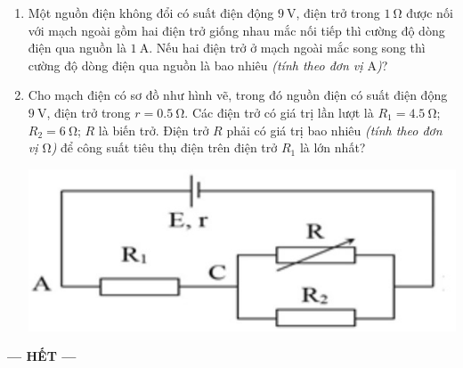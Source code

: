 \begin{enumerate}[label=\bfseries Câu \arabic*:]
\item Một nguồn điện không đổi có suất điện động $\SI{9}{\volt}$, điện trở trong $\SI{1}{\ohm}$ được nối với mạch ngoài gồm hai điện trở giống nhau mắc nối tiếp thì cường độ dòng điện qua nguồn là $\SI{1}{\ampere}$. Nếu hai điện trở ở mạch ngoài mắc song song thì cường độ dòng điện qua nguồn là bao nhiêu \textit{(tính theo đơn vị $\si{\ampere}$)}?



\item Cho mạch điện có sơ đồ như hình vẽ, trong đó nguồn điện có suất điện động $\SI{9}{\volt}$, điện trở trong $r=\SI{0.5}{\ohm}$. Các điện trở có giá trị lần lượt là $R_1=\SI{4.5}{\ohm}$; $R_2=\SI{6}{\ohm}$; $R$ là biến trở. Điện trở $R$ phải có giá trị bao nhiêu \textit{(tính theo đơn vị $\si{\ohm}$)} để công suất tiêu thụ điện trên điện trở $R_1$ là lớn nhất?
\begin{center}
	\includegraphics[width=0.4\linewidth]{../figs/PH11-FinalSem2-01-6}
\end{center}

\end{enumerate}
\begin{center}
	\textbf{--- HẾT ---}
\end{center}